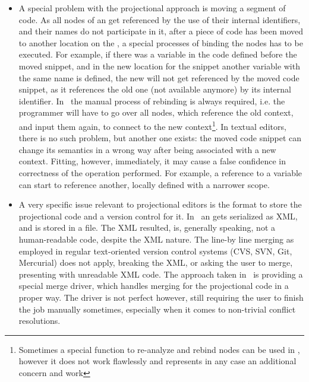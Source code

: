  \begin{itemize}
  \item A special problem with the projectional approach is moving a segment of code. As all nodes of an  get referenced by the use of their
  internal identifiers, and their names do not participate in it, after a piece of code has been moved to another location on the , 
  a special processes of binding the nodes has to be executed. For example, if there was a variable  in the code defined before the moved snippet,
  and in the new location for the snippet another variable with the same name  is defined, the new  will not get referenced by the 
  moved code snippet, as it references the old one (not available anymore) by its internal identifier. In \jbmps\ the manual process of rebinding is
  always required, i.e. the programmer will have to go over all nodes, which reference the old context, and input them again, to connect to the
  new context\footnote{Sometimes a special function to re-analyze and rebind nodes can be used in \jbmps, however it does not work flawlessly and 
  represents in any case an additional concern and work}. In textual editors, there is no such problem, but another one exists: the moved code snippet 
  can change its semantics in a wrong way
  after being associated with a new context. Fitting, however, immediately, it may cause a false confidence in correctness of the 
  operation performed. For example, a reference to a variable can start to reference another, 
  locally defined with a narrower scope.
  
  \item  A very specific issue relevant to projectional editors is the format to store the projectional code and a version control for it.
  In \jbmps\ an  gets serialized as XML, and is stored in a file. The XML resulted, is, generally speaking, not a human-readable 
  code, despite the XML nature. The line-by line merging as employed in regular text-oriented version control systems (CVS, SVN, Git, Mercurial)
  does not apply, breaking the XML, or asking the user to merge, presenting with unreadable XML code. The approach taken in \jbmps\ is providing
  a special merge driver, which handles merging for the projectional code in a proper way. The driver is not perfect however, still requiring 
  the user to finish the job manually sometimes, especially when it comes to non-trivial conflict resolutions.
  

\end{itemize}
